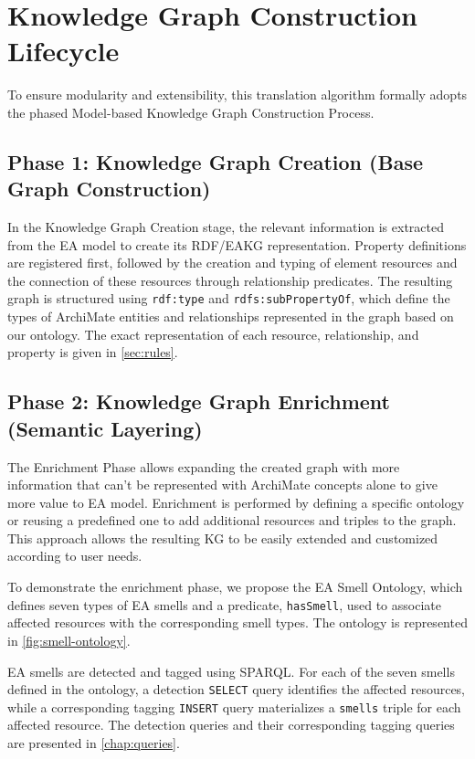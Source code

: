 \section{Knowledge Graph Construction Lifecycle}
\label{sec:kg-lifecycle}

To ensure modularity and extensibility, this translation algorithm formally adopts the phased Model-based Knowledge Graph Construction Process.

\subsection{Phase 1: Knowledge Graph Creation (Base Graph Construction)}
\label{subsec:phase1}

In the Knowledge Graph Creation stage, the relevant information is extracted from the EA model to create its RDF/EAKG representation. Property definitions are registered first, followed by the creation and typing of element resources and the connection of these resources through relationship predicates. The resulting graph is structured using \texttt{rdf:type} and \texttt{rdfs:subPropertyOf}, which define the types of ArchiMate entities and relationships represented in the graph based on our ontology. The exact representation of each resource, relationship, and property is given in \autoref{sec:rules}.

\subsection{Phase 2: Knowledge Graph Enrichment (Semantic Layering)}
\label{subsec:phase2}

The Enrichment Phase allows expanding the created graph with more information that can't be represented with ArchiMate concepts alone to give more value to EA model. Enrichment is performed by defining a specific ontology or reusing a predefined one to add additional resources and triples to the graph. This approach allows the resulting KG to be easily extended and customized according to user needs.

To demonstrate the enrichment phase, we propose the EA Smell Ontology, which defines seven types of EA smells and a predicate, \texttt{hasSmell}, used to associate affected resources with the corresponding smell types. The ontology is represented in \autoref{fig:smell-ontology}.

EA smells are detected and tagged using SPARQL. For each of the seven smells defined in the ontology, a detection \texttt{SELECT} query identifies the affected resources, while a corresponding tagging \texttt{INSERT} query materializes a \texttt{smells} triple for each affected resource. The detection queries and their corresponding tagging queries are presented in \autoref{chap:queries}.


